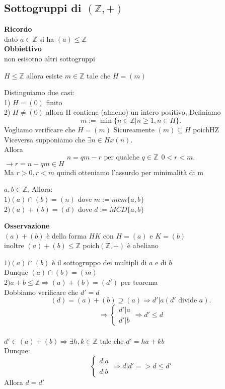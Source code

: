 \documentclass[12px]{article}
\begin{document}
{\subsection{Sottogruppi di $(\mathbb Z, +)$}
\textbf{Ricordo}\\
dato $a\in \mathbb Z$ si ha  $(a)\leq \mathbb Z$\\
 \textbf{Obbiettivo}\\
 non esisotno altri sottogruppi
 \begin{teo}
 	$H\leq \mathbb Z$ allora esiste $m\in \mathbb Z$ tale che  $H = (m)$
 \end{teo}
 \begin{dimo}
 	Distinguiamo due casi:\\
	1) $H= (0)$ finito\\
	2) $H\neq(0)$ allora H contiene (almeno) un intero positivo, Definiamo
	\[
		m := \min\lbrace n\in\mathbb Z | n\geq 1, n\in H\rbrace
	.\] 
	Vogliamo verificare che $H = (m)$ Sicureamente $(m)\subseteq H$ poich\e H\leq \mathbb Z\\
	Viceversa supponiamo che  $\exists n\in Hx(n)$.\\
	Allora
	 \[
		 n = qm - r \text{ per qualche } q\in \mathbb Z \ \ 0 < r < m
	.\] 
	$ \rightarrow r = n - qm \in H$\\
	Ma $r>0, r<m$ quindi otteniamo l'assurdo per minimalità di m

 \end{dimo}
 \begin{prop}
 	$a,b\in \mathbb Z$, Allora:\\
	$1) (a)\cap (b) = (n)$ dove $m := mcm\lbrace a,b\rbrace$\\
	$2) (a) + (b) = (d)$ dove  $d := MCD\lbrace a, b \rbrace$

 \end{prop}
 \textbf{Osservazione}\\ 
 $(a)+(b)$ è della forma $HK$ con $ H = (a)$ e $K = (b)$\\
 inoltre $(a) + (b)\leq \mathbb Z$ poich\e $(\mathbb Z, +)$ è abeliano
 \begin{dimo}
	 $1)(a)\cap (b)$ è il sottogruppo dei multipli di $a$ e di $b$\\
	 Dunque $(a)\cap(b) = (m)$ \\
	 $2)a+b\leq \mathbb Z \Rightarrow (a) + (b) = (d')$ per teorema\\
	 Dobbiamo verificare che $d' = d$ \\
	 \[
		 (d) = (a)+(b)\supseteq (a) \Rightarrow d'|a ( d'\text{ divide }a)
	 .\] 
	 \[ \Rightarrow  \begin{cases}
	 	d'|a\\
		d'|b
	\end{cases} \Rightarrow d'\leq d\]\\
	 $d'\in (a) + (b) \Rightarrow \exists h,k\in \mathbb Z$ tale che $d' = ha + kb$\\
	 Dunque:\\
	 \[
	  \begin{cases}
	  	d|a\\
		d|b
	  \end{cases} \Rightarrow d|d' => d \leq d'\]
	  Allora $d=d'$
 \end{dimo}
}
\end{document}
